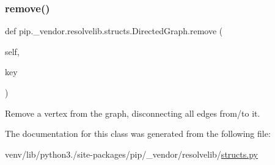 \subsubsection{\texorpdfstring{remove()}{remove()}}
{\footnotesize\ttfamily def pip.\+\_\+vendor.\+resolvelib.\+structs.\+Directed\+Graph.\+remove (\begin{DoxyParamCaption}\item[{}]{self,  }\item[{}]{key }\end{DoxyParamCaption})}

\begin{DoxyVerb}Remove a vertex from the graph, disconnecting all edges from/to it.\end{DoxyVerb}
 

The documentation for this class was generated from the following file\+:\begin{DoxyCompactItemize}
\item 
venv/lib/python3./site-\/packages/pip/\+\_\+vendor/resolvelib/\hyperlink{structs_8py}{structs.\+py}\end{DoxyCompactItemize}
